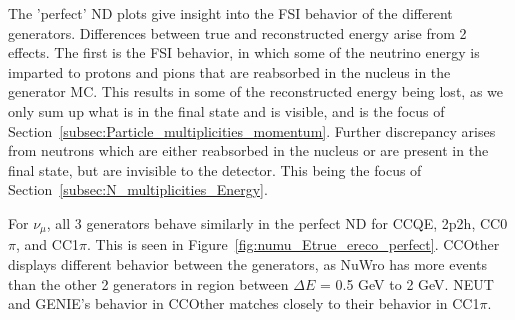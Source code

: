 \documentclass[12pt]{article}
\begin{document}
The 'perfect' ND plots give insight into the FSI behavior of the different generators. Differences between true and reconstructed energy arise from 2 effects. The first is the FSI behavior, in which some of the neutrino energy is imparted to protons and pions that are reabsorbed in the nucleus in the generator MC. This results in some of the reconstructed energy being lost, as we only sum up what is in the final state and is visible, and is the focus of Section~\ref{subsec:Particle_multiplicities_momentum}. Further discrepancy arises from neutrons which are either reabsorbed in the nucleus or are present in the final state, but are invisible to the detector. This being the focus of Section~\ref{subsec:N_multiplicities_Energy}. 

For $\nu_\mu$, all 3 generators behave similarly in the perfect ND for CCQE, 2p2h, CC0$\pi$, and CC1$\pi$. This is seen in Figure~\ref{fig:numu_Etrue_ereco_perfect}. CCOther displays different behavior between the generators, as NuWro has more events than the other 2 generators in region between $\Delta E$ = 0.5 GeV to 2 GeV. NEUT and GENIE's behavior in CCOther matches closely to their behavior in CC1$\pi$. 
\end{document}
